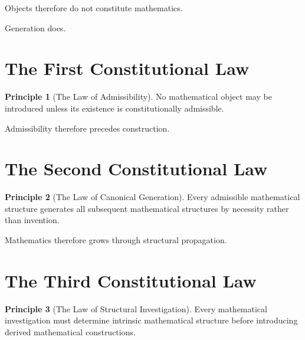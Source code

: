 \documentclass[13pt,openany]{book}
\theoremstyle{plain}
\theoremstyle{definition}
\newtheorem{principle}{Principle}[chapter]
\begin{document}
Objects therefore do not constitute mathematics.

Generation does.

\section{The First Constitutional Law}

\begin{principle}[The Law of Admissibility]

No mathematical object may be introduced unless its existence is
constitutionally admissible.

\end{principle}

Admissibility therefore precedes construction.

\section{The Second Constitutional Law}

\begin{principle}[The Law of Canonical Generation]

Every admissible mathematical structure generates all subsequent mathematical
structures by necessity rather than invention.

\end{principle}

Mathematics therefore grows through structural propagation.

\section{The Third Constitutional Law}

\begin{principle}[The Law of Structural Investigation]

Every mathematical investigation must determine intrinsic mathematical
structure before introducing derived mathematical constructions.

\end{principle}
\end{document}
